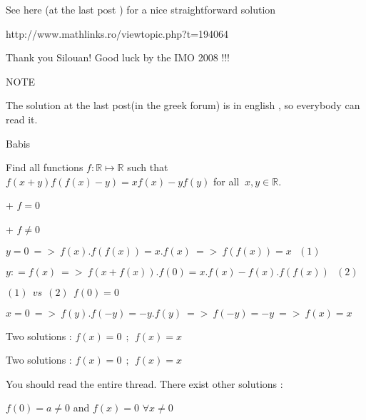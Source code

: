 \begin{solution}
	\begin{tcolorbox}See here (at the last post ) for a nice straightforward solution 

http://www.mathlinks.ro/viewtopic.php?t=194064\end{tcolorbox}

 Thank you Silouan!
 Good luck by the IMO 2008 !!!

 \begin{bolded}NOTE\end{bolded}

 The solution at the last post(in the greek forum) is in english , so everybody can read it.

 Babis
\end{solution}



\begin{solution}
	\begin{tcolorbox}Find all functions $ f : \mathbb{R} \mapsto \mathbb{R}$ such that $ f(x + y)f(f(x) - y) = xf(x) - yf(y)$ for all $ \ x,y \in \mathbb{R}.$\end{tcolorbox}

+ $ f = 0$

+ $ f \neq 0$

$ y = 0\ = > \ f(x).f(f(x)) = x.f(x) \ = > \ f(f(x)) = x \ \ \ (1)$

$ y: = f(x)\ = > \ f(x + f(x)).f(0) = x.f(x) - f(x).f(f(x))\ \ \ (2)$

$ (1)\ \ vs\ \ (2) \ \ f(0) = 0$

$ x = 0\ = > \ f(y).f( - y) = - y.f(y) \ = > \ f( - y) = - y\ = > \ f(x) = x$

Two solutions :  $ f(x) = 0 \ \ ; \ \ f(x) = x$
\end{solution}



\begin{solution}
	\begin{tcolorbox} 
Two solutions :  $ f(x) = 0 \ \ ; \ \ f(x) = x$\end{tcolorbox}

You should read the entire thread.
There exist other solutions :

$ f(0)=a\neq 0$ and $ f(x)=0$ $ \forall x\neq 0$
\end{solution}



